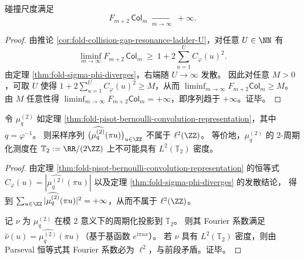 \begin{corollary}[碰撞尺度的无界增长]\label{cor:fold-collision-scale-diverges}
碰撞尺度满足
\[
F_{m+2}\,\mathsf{Col}_m\ \xrightarrow[m\to\infty]{}\ +\infty.
\]
\end{corollary}

\begin{proof}
由推论 \ref{cor:fold-collision-gap-resonance-ladder-U}，对任意 \(U\in\NN\) 有
\[
\liminf_{m\to\infty}F_{m+2}\,\mathsf{Col}_m\ \ge\ 1+2\sum_{u=1}^{U}C_\varphi(u)^2.
\]
由定理 \ref{thm:fold-sigma-phi-diverges}，右端随 \(U\to\infty\) 发散。
因此对任意 \(M>0\)，可取 \(U\) 使得 \(1+2\sum_{u=1}^{U}C_\varphi(u)^2\ge M\)，从而 \(\liminf_{m\to\infty}F_{m+2}\mathsf{Col}_m\ge M\)。
由 \(M\) 任意性得 \(\liminf_{m\to\infty}F_{m+2}\mathsf{Col}_m=+\infty\)，即序列趋于 \(+\infty\)。证毕。
\end{proof}

\begin{corollary}\label{cor:fold-bernoulli-fourier-sampling-not-l2}
令 \(\mu_q^{(2)}\) 如定理 \ref{thm:fold-pisot-bernoulli-convolution-representation}，其中 \(q=\varphi^{-1}\)。
则采样序列 \(\bigl(\widehat{\mu_q^{(2)}}(\pi u)\bigr)_{u\in\ZZ}\) 不属于 \(\ell^2(\ZZ)\)。
等价地，\(\mu_q^{(2)}\) 的 \(2\)-周期化测度在 \(\mathbb{T}_2:=\RR/(2\ZZ)\) 上不可能具有 \(L^2(\mathbb{T}_2)\) 密度。
\end{corollary}

\begin{proof}
由定理 \ref{thm:fold-pisot-bernoulli-convolution-representation} 的恒等式 \(C_\varphi(u)=|\widehat{\mu_q^{(2)}}(\pi u)|\) 以及定理 \ref{thm:fold-sigma-phi-diverges} 的发散结论，
得到 \(\sum_{u\in\ZZ}|\widehat{\mu_q^{(2)}}(\pi u)|^2=+\infty\)，从而不属于 \(\ell^2(\ZZ)\)。
\par
记 \(\nu\) 为 \(\mu_q^{(2)}\) 在模 \(2\) 意义下的周期化投影到 \(\mathbb{T}_2\)。
则其 Fourier 系数满足 \(\widehat{\nu}(u)=\widehat{\mu_q^{(2)}}(\pi u)\)（基于基函数 \(e^{\mathrm{i}\pi ux}\)）。
若 \(\nu\) 具有 \(L^2(\mathbb{T}_2)\) 密度，则由 Parseval 恒等式其 Fourier 系数必为 \(\ell^2\)，与前段矛盾。证毕。
\end{proof}

